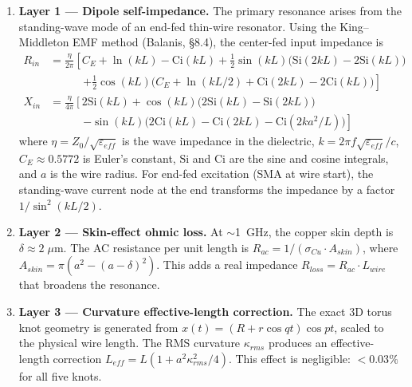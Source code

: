 \begin{enumerate}
    \item \textbf{Layer 1 --- Dipole self-impedance.} The primary resonance arises from the standing-wave mode of an end-fed thin-wire resonator. Using the King--Middleton EMF method (Balanis, \S8.4), the center-fed input impedance is
    \begin{align}
        R_{in} &= \frac{\eta}{2\pi}\!\left[C_E + \ln(kL) - \mathrm{Ci}(kL) + \tfrac{1}{2}\sin(kL)\bigl(\mathrm{Si}(2kL) - 2\mathrm{Si}(kL)\bigr) \right. \nonumber \\
        &\qquad\quad \left. + \tfrac{1}{2}\cos(kL)\bigl(C_E + \ln(kL/2) + \mathrm{Ci}(2kL) - 2\mathrm{Ci}(kL)\bigr)\right] \\
        X_{in} &= \frac{\eta}{4\pi}\!\left[2\mathrm{Si}(kL) + \cos(kL)\bigl(2\mathrm{Si}(kL) - \mathrm{Si}(2kL)\bigr) \right. \nonumber \\
        &\qquad\quad \left. - \sin(kL)\bigl(2\mathrm{Ci}(kL) - \mathrm{Ci}(2kL) - \mathrm{Ci}(2ka^2/L)\bigr)\right]
    \end{align}
    where $\eta = Z_0/\sqrt{\varepsilon_{eff}}$ is the wave impedance in the dielectric, $k = 2\pi f\sqrt{\varepsilon_{eff}}/c$, $C_E \approx 0.5772$ is Euler's constant, $\mathrm{Si}$ and $\mathrm{Ci}$ are the sine and cosine integrals, and $a$ is the wire radius. For end-fed excitation (SMA at wire start), the standing-wave current node at the end transforms the impedance by a factor $1/\sin^2(kL/2)$.

    \item \textbf{Layer 2 --- Skin-effect ohmic loss.} At $\sim$1~GHz, the copper skin depth is $\delta \approx 2\;\mu\text{m}$. The AC resistance per unit length is $R_{ac} = 1/(\sigma_{Cu} \cdot A_{skin})$, where $A_{skin} = \pi(a^2 - (a-\delta)^2)$. This adds a real impedance $R_{loss} = R_{ac} \cdot L_{wire}$ that broadens the resonance.

    \item \textbf{Layer 3 --- Curvature effective-length correction.} The exact 3D torus knot geometry is generated from $x(t) = (R + r\cos qt)\cos pt$, scaled to the physical wire length. The RMS curvature $\kappa_{rms}$ produces an effective-length correction $L_{eff} = L(1 + a^2\kappa_{rms}^2/4)$. This effect is negligible: $<0.03\%$ for all five knots.


\end{enumerate}
